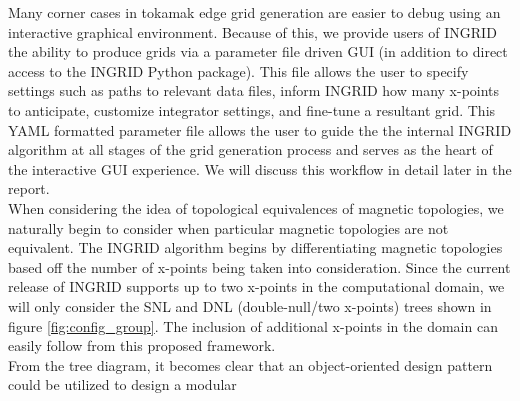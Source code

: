 
%
%
\indent Many corner cases in tokamak edge grid generation are easier
to debug using an interactive graphical environment. Because of this,
we provide users of INGRID the ability to produce grids via a
parameter file driven GUI (in addition to direct access to the INGRID
Python package). This file allows the user to specify settings such as
paths to relevant data files, inform INGRID how many x-points to
anticipate, customize integrator settings, and fine-tune a resultant
grid. This YAML formatted parameter file allows the user to guide the
the internal INGRID algorithm at all stages of the grid generation
process and serves as the heart of the interactive GUI experience. We
will discuss this workflow in detail later in the report.\\
%
\indent When considering the idea of topological equivalences of
magnetic topologies, we naturally begin to consider when particular
magnetic topologies are not equivalent. The INGRID algorithm begins by
differentiating magnetic topologies based off the number of x-points
being taken into consideration. Since the current release of INGRID
supports up to two x-points in the computational domain, we will only
consider the SNL and DNL (double-null/two x-points) trees shown in
figure \ref{fig:config_group}. The inclusion of additional x-points in
the domain can easily follow from this proposed framework. \\
%
\indent From the tree diagram, it becomes clear that an
object-oriented design pattern could be utilized to design a modular
